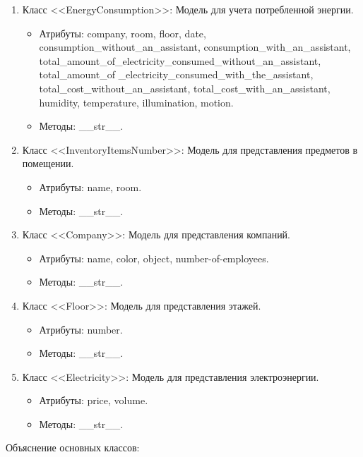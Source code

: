 \begin{enumerate}
	
\item {Класс <<EnergyConsumption>>:} Модель для учета потребленной энергии.
\begin{itemize}
	\item {Атрибуты:}  company, room, floor, date, consumption\_without\_an\_assistant, consumption\_with\_an\_assistant, total\_amount\_of\_electricity\_consumed\_without\_an\_assistant, total\_amount\_of \_electricity\_consumed\_with\_the\_assistant, total\_cost\_without\_an\_assistant, total\_cost\_with\_an\_assistant, humidity, temperature, illumination, motion.
	\item {Методы:} {\_\_str\_\_}.
\end{itemize}

\item {Класс <<InventoryItemsNumber>>:} Модель для представления предметов в помещении.
\begin{itemize}
	\item {Атрибуты:} name, room.
	\item {Методы:} \_\_str\_\_.
\end{itemize}

\item {Класс <<Company>>:} Модель для представления компаний.
\begin{itemize}
	\item {Атрибуты:} name, color, object, number-of-employees.
	\item {Методы:} \_\_str\_\_.
\end{itemize}

\item {Класс <<Floor>>:} Модель для представления этажей.
\begin{itemize}
	\item {Атрибуты:} number.
	\item {Методы:} \_\_str\_\_.
\end{itemize}

\item {Класс <<Electricity>>:} Модель для представления электроэнергии.
\begin{itemize}
	\item {Атрибуты:} price, volume.
	\item {Методы:} \_\_str\_\_.
\end{itemize}
\end{enumerate}

{Объяснение основных классов:}


